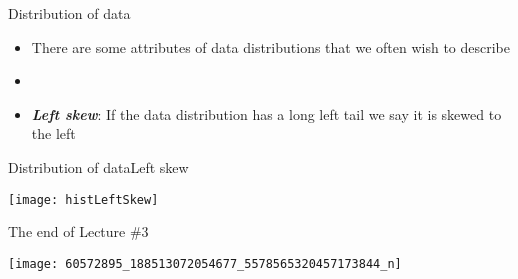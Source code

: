 \documentclass[xcolor=dvipsnames]{beamer}
\begin{document}
\begin{frame}{Distribution of data}
	\begin{itemize}
		\item There are some attributes of data distributions that we often wish to describe
		\item[]
		\item \textbf{\emph{Left skew}}: If the data distribution has a long left tail we say it is skewed to the left
	\end{itemize}
\end{frame}

\begin{frame}{Distribution of data}{Left skew}
	\begin{center}
		\texttt{[image: histLeftSkew]}
	\end{center}
\end{frame}

\begin{frame}{The end of Lecture \#3}
	\begin{center}
		\texttt{[image: 60572895\_188513072054677\_5578565320457173844\_n]}
	\end{center}
\end{frame}
\end{document}
